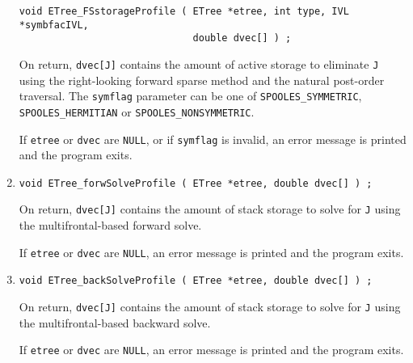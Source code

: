 \begin{enumerate}
\begin{verbatim}
void ETree_FSstorageProfile ( ETree *etree, int type, IVL *symbfacIVL,
                              double dvec[] ) ;
\end{verbatim}
\par
On return, {\tt dvec[J]} contains the amount of active storage to
eliminate {\tt J} using the right-looking forward sparse method 
and the natural post-order traversal.
The {\tt symflag} parameter can be one of {\tt SPOOLES\_SYMMETRIC},
{\tt SPOOLES\_HERMITIAN} or {\tt SPOOLES\_NONSYMMETRIC}.
\par {}
If {\tt etree} or {\tt dvec} are {\tt NULL}, 
or if {\tt symflag} is invalid,
an error message is printed and the program exits.
\item
\begin{verbatim}
void ETree_forwSolveProfile ( ETree *etree, double dvec[] ) ;
\end{verbatim}
\par
On return, {\tt dvec[J]} contains the amount of stack storage to
solve for {\tt J} using the multifrontal-based forward solve.
\par {}
If {\tt etree} or {\tt dvec} are {\tt NULL}, 
an error message is printed and the program exits.
\item
\begin{verbatim}
void ETree_backSolveProfile ( ETree *etree, double dvec[] ) ;
\end{verbatim}
\par
On return, {\tt dvec[J]} contains the amount of stack storage to
solve for {\tt J} using the multifrontal-based backward solve.
\par {}
If {\tt etree} or {\tt dvec} are {\tt NULL}, 
an error message is printed and the program exits.
\end{enumerate}
\par
